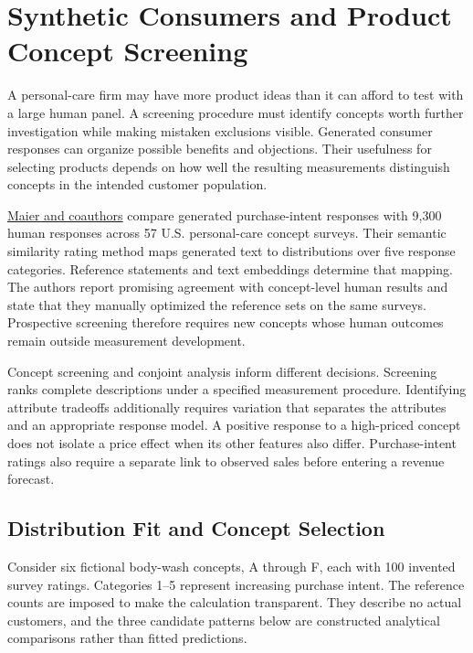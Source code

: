 \hypertarget{M04-synthetic-consumers-and-product-concept-screening}{%
\section{Synthetic Consumers and Product Concept
Screening}\label{M04-synthetic-consumers-and-product-concept-screening}}

\noindent \noindent A personal-care firm may have more product ideas than it can
afford to test with a large human panel. A screening procedure must
identify concepts worth further investigation while making mistaken
exclusions visible. Generated consumer responses can organize possible
benefits and objections. Their usefulness for selecting products depends
on how well the resulting measurements distinguish concepts in the
intended customer population.

\href{https://arxiv.org/abs/2510.08338v3}{Maier and coauthors} compare
generated purchase-intent responses with 9,300 human responses across 57
U.S. personal-care concept surveys. Their semantic similarity rating
method maps generated text to distributions over five response
categories. Reference statements and text embeddings determine that
mapping. The authors report promising agreement with concept-level human
results and state that they manually optimized the reference sets on the
same surveys. Prospective screening therefore requires new concepts
whose human outcomes remain outside measurement development.

Concept screening and conjoint analysis inform different decisions.
Screening ranks complete descriptions under a specified measurement
procedure. Identifying attribute tradeoffs additionally requires
variation that separates the attributes and an appropriate response
model. A positive response to a high-priced concept does not isolate a
price effect when its other features also differ. Purchase-intent
ratings also require a separate link to observed sales before entering a
revenue forecast.

\hypertarget{M04-distribution-fit-and-concept-selection}{%
\subsection{Distribution Fit and Concept
Selection}\label{M04-distribution-fit-and-concept-selection}}

\noindent \noindent Consider six fictional body-wash concepts, A through F, each
with 100 invented survey ratings. Categories 1--5 represent increasing
purchase intent. The reference counts are imposed to make the
calculation transparent. They describe no actual customers, and the
three candidate patterns below are constructed analytical comparisons
rather than fitted predictions.

